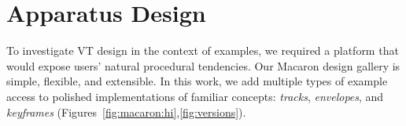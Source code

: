 %
%
\section{Apparatus Design}
%
To investigate VT design in the context of examples, we required a platform that would expose users' natural procedural tendencies. 
Our Macaron design gallery is simple, flexible, and extensible.
In this work, we add multiple types of example access to polished implementations of familiar concepts: \emph{tracks}, \emph{envelopes}, and \emph{keyframes}
(Figures~\ref{fig:macaron:hi},\ref{fig:versions}).
%


